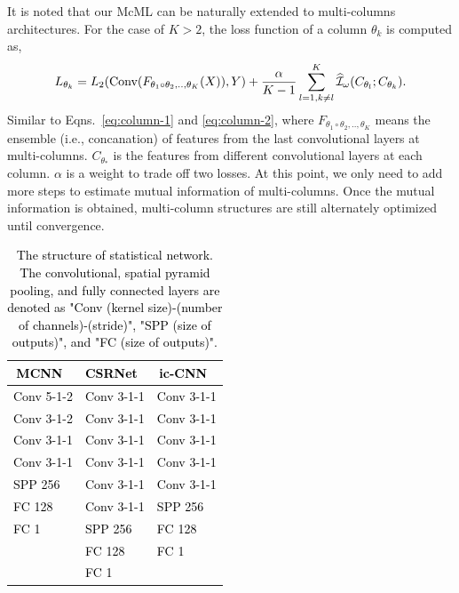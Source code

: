 \documentclass[sigconf]{acmart}
\newcommand{\ljx}[1]{\textcolor{black}{#1}}
\newcommand{\czq}[1]{\textcolor{black}{#1}}
\newcommand{\beq}{\begin{equation}}
\newcommand{\eeq}{\end{equation}}
\newcommand{\II}{\mathcal{I}}
\newcommand\Eqs{Eqns.}
\begin{document}
It is noted that our McML can be naturally extended to multi-columns architectures. 
For the case of $K>2$, the loss function of a column $\theta_k$ is computed as,
\vspace{-2mm}
\beq
\normalsize
\label{eqn:mutual-column-k}
L_{\theta_{k}} = L_2(\mbox{Conv}(F_{\theta_1 \circ \theta_2,..,\theta_K}(X)),Y)+\frac{\alpha}{K-1}\sum_{l=1, k \neq l}^{K} \widehat{\II}_{\omega}(C_{\theta_l}; C_{\theta_k}).
\eeq
Similar to \Eqs~\ref{eq:column-1} and \ref{eq:column-2}, where $F_{\theta_1 \circ \theta_2,..,\theta_K}$ means the ensemble (i.e., concanation) of features from the last convolutional layers at \ljx{m}ulti-columns. 
$C_{\theta_{*}}$ is the features from different convolutional layers at each column.
$\alpha$ is a weight to trade off two losses.
At this point, we only need to add more steps to estimate mutual information of multi-columns.
Once the mutual information is obtained, multi-column structures are still alternately optimized until convergence.



\begin{table}[!b]
\small
\caption{\small The structure of statistic\ljx{al} network.
The convolutional, spatial pyramid pooling, and fully connected layers are denoted as "Conv (kernel size)-(\ljx{number of channels})-(stride)", "SPP (\ljx{size of outputs})", and "FC (\ljx{size of outputs})".
}
\renewcommand\arraystretch{0.9}
\begin{center}
\vspace{-2mm}
\czq{\begin{tabular}{|l|l|l|} 
\hline
\multicolumn{1}{|c|}{\textbf{MCNN}~\cite{MCNN-16}} & \multicolumn{1}{c|}{\textbf{CSRNet}~\cite{CSRNet-18}} & \multicolumn{1}{c|}{\textbf{ic-CNN}~\cite{deep-training-ICCNN-18}}  \\ 
\hline \hline
Conv 5-1-2    & Conv 3-1-1     & Conv 3-1-1      \\
Conv 3-1-2    & Conv 3-1-1     & Conv 3-1-1      \\
Conv 3-1-1    & Conv 3-1-1     & Conv 3-1-1      \\
Conv 3-1-1    & Conv 3-1-1     & Conv 3-1-1      \\
SPP 256       & Conv 3-1-1     & Conv 3-1-1     \\
FC 128      & Conv 3-1-1     & SPP 256         \\
FC 1        & SPP 256        & FC 128      \\
              & FC 128       & FC 1        \\
              & FC 1         &                  \\
\hline
\end{tabular}}
\end{center}
\vspace{-2mm}
\label{tab:statistics-network}
\end{table}
\end{document}
